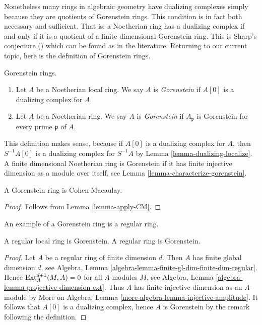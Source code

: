 \medskip\noindent
Nonetheless many rings in algebraic geometry have dualizing complexes
simply because they are quotients of Gorenstein rings. This condition
is in fact both necessary and sufficient. That is: a Noetherian ring
has a dualizing complex if and only if it is a quotient of a finite
dimensional Gorenstein ring. This is Sharp's conjecture (\cite{Sharp})
which can be found as \cite[Corollary 1.4]{Kawasaki} in the literature.
Returning to our current topic, here is the definition of Gorenstein rings.

\begin{definition}
\label{definition-gorenstein}
Gorenstein rings.
\begin{enumerate}
\item Let $A$ be a Noetherian local ring. We say $A$ is {\it Gorenstein}
if $A[0]$ is a dualizing complex for $A$.
\item Let $A$ be a Noetherian ring. We say $A$ is {\it Gorenstein}
if $A_\mathfrak p$ is Gorenstein for every prime $\mathfrak p$ of $A$.
\end{enumerate}
\end{definition}

\noindent
This definition makes sense, because if $A[0]$ is a dualizing complex
for $A$, then $S^{-1}A[0]$ is a dualizing complex for $S^{-1}A$ by
Lemma \ref{lemma-dualizing-localize}.
A finite dimensional Noetherian ring is Gorenstein
if it has finite injective dimension as a module over itself, see
Lemma \ref{lemma-characterize-gorenstein}.

\begin{lemma}
\label{lemma-gorenstein-CM}
A Gorenstein ring is Cohen-Macaulay.
\end{lemma}

\begin{proof}
Follows from Lemma \ref{lemma-apply-CM}.
\end{proof}

\noindent
An example of a Gorenstein ring is a regular ring.

\begin{lemma}
\label{lemma-regular-gorenstein}
A regular local ring is Gorenstein.
A regular ring is Gorenstein.
\end{lemma}

\begin{proof}
Let $A$ be a regular ring of finite dimension $d$. Then $A$ has finite
global dimension $d$, see
Algebra, Lemma \ref{algebra-lemma-finite-gl-dim-finite-dim-regular}.
Hence $\mathop{\mathrm{Ext}}\nolimits^{d + 1}_A(M, A) = 0$ for all $A$-modules $M$, see
Algebra, Lemma \ref{algebra-lemma-projective-dimension-ext}.
Thus $A$ has finite injective dimension as an $A$-module by
More on Algebra, Lemma \ref{more-algebra-lemma-injective-amplitude}.
It follows that $A[0]$ is a dualizing complex, hence $A$ is
Gorenstein by the remark following the definition.
\end{proof}

